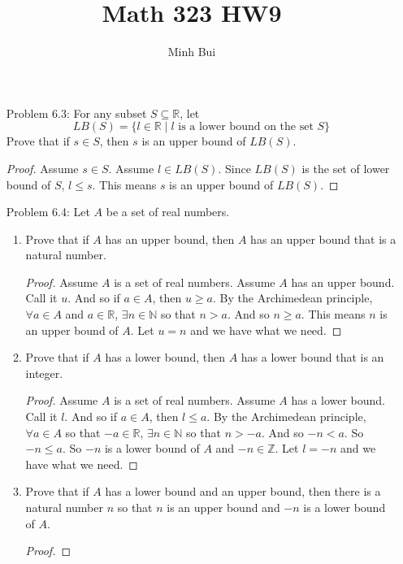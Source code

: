 \documentclass{article}
\author{Minh Bui}
\title{Math 323 HW9}
\theoremstyle{claim}
\theoremstyle{definition}
\begin{document}
\maketitle
\begin{enumerate}
    \item[Problem 6.3:] For any subset $S \subseteq \mathbb{R}$, let
        \begin{equation*}
            LB(S) = \{ l \in \mathbb{R} \mid l \text{ is a lower bound on the set } S \}
        \end{equation*}
        Prove that if $s \in S$, then $s$ is an upper bound of $LB(S)$.
        \begin{proof}
            Assume $s \in S$. Assume $l \in LB(S)$. Since $LB(S)$ is the set of lower bound of $S$, $l \le s$. This means $s$ is an upper bound of $LB(S)$. 
        \end{proof}
    \item[Problem 6.4:] Let $A$ be a set of real numbers.
        \begin{enumerate}
            \item Prove that if $A$ has an upper bound, then $A$ has an upper bound that is a natural number.
            \begin{proof}
                Assume $A$ is a set of real numbers. Assume $A$ has an upper bound. Call it $u$. And so if $a \in A$, then $u \ge a$. By the Archimedean principle, $\forall a \in A$ and $a \in \mathbb{R}$, $\exists n \in \mathbb{N}$ so that $n > a$. And so $n \ge a$. This means $n$ is an upper bound of $A$. Let $u = n$ and we have what we need.
            \end{proof}
            \item Prove that if $A$ has a lower bound, then $A$ has a lower bound that is an integer.
            \begin{proof}
                Assume $A$ is a set of real numbers. Assume $A$ has a lower bound. Call it $l$. And so if $a \in A$, then $l \le a$. By the Archimedean principle, $\forall a \in A$ so that $-a \in \mathbb{R}$, $\exists n \in \mathbb{N}$ so that $n > -a$. And so $-n < a$. So $-n \le a$. So $-n$ is a lower bound of $A$ and $-n \in \mathbb{Z}$. Let $l = -n$ and we have what we need.
            \end{proof}
            \item Prove that if $A$ has a lower bound and an upper bound, then there is a natural number $n$ so that $n$ is an upper bound and $-n$ is a lower bound of $A$.
            \begin{proof}

\end{proof}
\end{enumerate}
\end{enumerate}
\end{document}
